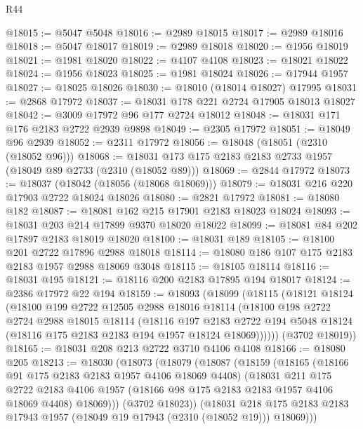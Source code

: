 \begin{lexlean}{R44}
\begin{coremodule}
@18015 := @5047 @5048
@18016 := @2989 @18015
@18017 := @2989 @18016
@18018 := @5047 @18017
@18019 := @2989 @18018
@18020 := @1956 @18019
@18021 := @1981 @18020
@18022 := @4107 @4108
@18023 := @18021 @18022
@18024 := @1956 @18023
@18025 := @1981 @18024
@18026 := @17944 @1957
@18027 := @18025 @18026
@18030 := @18010 (@18014 @18027) @17995
@18031 := @2868 @17972
@18037 := @18031 @178 @221 @2724 @17905 @18013 @18027
@18042 := @3009 @17972 @96 @177 @2724 @18012
@18048 := @18031 @171 @176 @2183 @2722 @2939 @9898
@18049 := @2305 @17972
@18051 := @18049 @96 @2939
@18052 := @2311 @17972
@18056 := @18048 (@18051 (@2310 (@18052 @96)))
@18068 := @18031 @173 @175 @2183 @2183 @2733 @1957 (@18049 @89 @2733 (@2310 (@18052 @89)))
@18069 := @2844 @17972
@18073 := @18037 (@18042 (@18056 (@18068 @18069)))
@18079 := @18031 @216 @220 @17903 @2722 @18024 @18026
@18080 := @2821 @17972
@18081 := @18080 @182
@18087 := @18081 @162 @215 @17901 @2183 @18023 @18024
@18093 := @18031 @203 @214 @17899 @9370 @18020 @18022
@18099 := @18081 @84 @202 @17897 @2183 @18019 @18020
@18100 := @18031 @189
@18105 := @18100 @201 @2722 @17896 @2988 @18018
@18114 := @18080 @186 @107 @175 @2183 @2183 @1957 @2988 @18069 @3048
@18115 := @18105 @18114
@18116 := @18031 @195
@18121 := @18116 @200 @2183 @17895 @194 @18017
@18124 := @2386 @17972 @22 @194
@18159 := @18093
    (@18099
      (@18115
        (@18121
          @18124
          (@18100
            @199
            @2722
            @12505
            @2988
            @18016
            @18114
            (@18100
              @198
              @2722
              @2724
              @2988
              @18015
              @18114
              (@18116
                @197
                @2183
                @2722
                @194
                @5048
                @18124
                (@18116 @175 @2183 @2183 @194 @1957 @18124 @18069))))))
      (@3702 @18019))
@18165 := @18031 @208 @213 @2722 @3710 @4106 @4108
@18166 := @18080 @205
@18213 := @18030
    (@18073
      (@18079
        (@18087
          (@18159
            (@18165
              (@18166 @91 @175 @2183 @2183 @1957 @4106 @18069 @4408)
              (@18031
                @211
                @175
                @2722
                @2183
                @4106
                @1957
                (@18166 @98 @175 @2183 @2183 @1957 @4106 @18069 @4408)
                @18069)))
          (@3702 @18023))
        (@18031
          @218
          @175
          @2183
          @2183
          @17943
          @1957
          (@18049 @19 @17943 (@2310 (@18052 @19)))
          @18069)))

\end{coremodule}
\end{lexlean}
